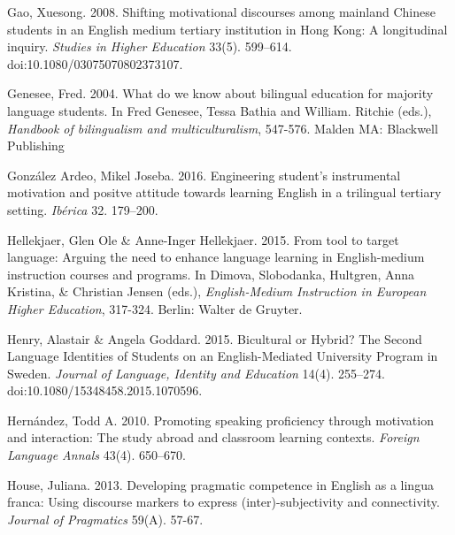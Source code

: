 \begin{styleStandard}
Gao, Xuesong. 2008. Shifting motivational discourses among mainland Chinese students in an English medium tertiary institution in Hong Kong: A longitudinal inquiry. \textit{Studies in Higher Education} 33(5). 599–614. doi:10.1080/03075070802373107.
\end{styleStandard}


\begin{styleStandard}
Genesee, Fred. 2004. What do we know about bilingual education for majority language students. In Fred Genesee, Tessa Bathia and William. Ritchie (eds.), \textit{Handbook of bilingualism and multiculturalism}, 547-576. Malden MA: Blackwell Publishing
\end{styleStandard}


\begin{styleStandard}
González Ardeo, Mikel Joseba. 2016. Engineering student’s instrumental motivation and positve attitude towards learning English in a trilingual tertiary setting. \textit{Ibérica} 32. 179–200.
\end{styleStandard}


\begin{styleStandard}
Hellekjaer, Glen Ole \& Anne-Inger Hellekjaer. 2015. From tool to target language: Arguing the need to enhance language learning in English-medium instruction courses and programs. In Dimova, Slobodanka, Hultgren, Anna Kristina, \& Christian Jensen (eds.), \textit{English-Medium Instruction in European Higher Education},\textit{ }317-324. Berlin: Walter de Gruyter. 
\end{styleStandard}


\begin{styleStandard}
Henry, Alastair \& Angela Goddard. 2015. Bicultural or Hybrid? The Second Language Identities of Students on an English-Mediated University Program in Sweden. \textit{Journal of Language, Identity and Education} 14(4). 255–274. doi:10.1080/15348458.2015.1070596.
\end{styleStandard}


\begin{styleStandard}
Hernández, Todd A. 2010. Promoting speaking proficiency through motivation and interaction: The study abroad and classroom learning contexts. \textit{Foreign Language Annals} 43(4). 650–670.
\end{styleStandard}


\begin{styleStandard}
House, Juliana. 2013. Developing pragmatic competence in English as a lingua franca: Using discourse markers to express (inter)-subjectivity and connectivity. \textit{Journal of Pragmatics }59(A). 57-67.
\end{styleStandard}


